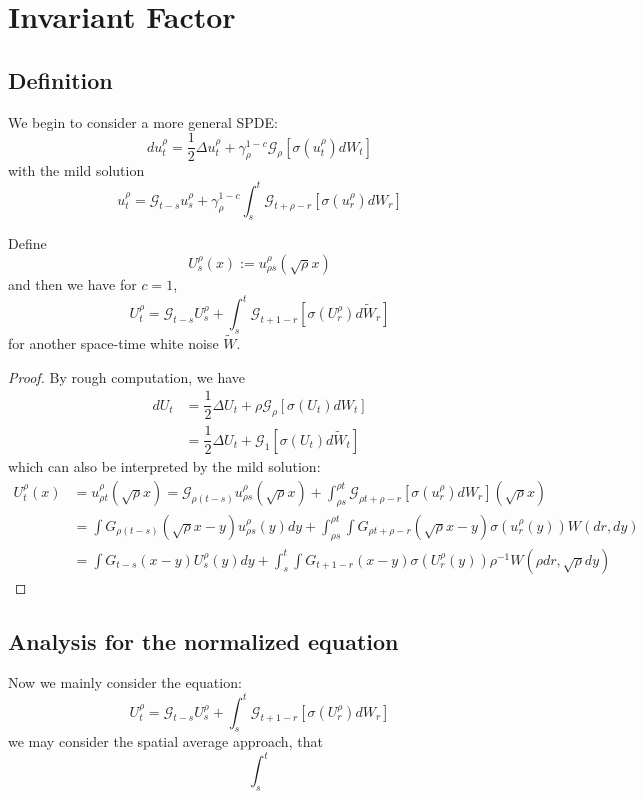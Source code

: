 \section{Invariant Factor}

\subsection{Definition}

    We begin to consider a more general SPDE:
    \[
    du_t^{\rho} = \dfrac{1}{2}\Delta u_t^{\rho} + \gamma_{\rho}^{1-c}\mathcal{G}_{\rho}[\sigma(u_t^{\rho})dW_{t}]
    \]
    with the mild solution
    \[
    u_t^{\rho} = \mathcal{G}_{t-s}u_s^{\rho} + \gamma_{\rho}^{1-c}\int_s^{t}\mathcal{G}_{t+\rho-r}[\sigma(u_r^{\rho})dW_r]
    \]
\begin{proposition}
    Define
    \[
    U_s^{\rho}(x) := u_{\rho s}^{\rho}(\sqrt{\rho}x)
    \]
    and then we have for $c=1$,
    \[
    U_t^{\rho} = \mathcal{G}_{t-s}U^{\rho}_s + \int_s^t \mathcal{G}_{t+1-r}[\sigma(U_r^{\rho})d\widetilde{W}_r]
    \]
    for another space-time white noise $\widetilde{W}$.
\end{proposition}
\begin{proof}
    By rough computation, we have
    \[
    \begin{aligned}
    dU_t &= \dfrac{1}{2}\Delta U_t + \rho\mathcal{G}_{\rho}[\sigma(U_t)dW_t] \\
    &= \dfrac{1}{2}\Delta U_t + \mathcal{G}_1[\sigma(U_t)d\widetilde{W}_t]
    \end{aligned}
    \]
    which can also be interpreted by the mild solution:
    \[
    \begin{aligned}
        U_t^{\rho}(x) &= u^{\rho}_{\rho t}(\sqrt{\rho}x) = \mathcal{G}_{\rho (t-s)}u^{\rho}_{\rho s}(\sqrt{\rho}x)+\int_{\rho s}^{\rho t}\mathcal{G}_{\rho t+\rho-r}[\sigma(u^{\rho}_r) dW_r](\sqrt{\rho}x) \\
        &= \int G_{\rho(t-s)}(\sqrt{\rho} x - y)u^{\rho}_{\rho s}(y)dy + \int_{\rho s}^{\rho t} \int G_{\rho t +\rho-r}(\sqrt{\rho}x-y)\sigma(u_r^{\rho}(y))W(dr,dy)\\
        &= \int G_{t-s}(x-y)U_s^{\rho}(y)dy + \int_s^t \int G_{t+1-r}(x-y)\sigma(U_r^{\rho}(y))\rho^{-1} W(\rho dr,\sqrt{\rho}dy)
    \end{aligned}
    \]
\end{proof}

\subsection{Analysis for the normalized equation}

Now we mainly consider the equation:
\[
U_t^{\rho} = \mathcal{G}_{t-s}U^{\rho}_s+\int_s^t \mathcal{G}_{t+1-r}[\sigma(U_r^{\rho})dW_r]
\]
we may consider the spatial average approach, that
\[
\int_s^t
\]